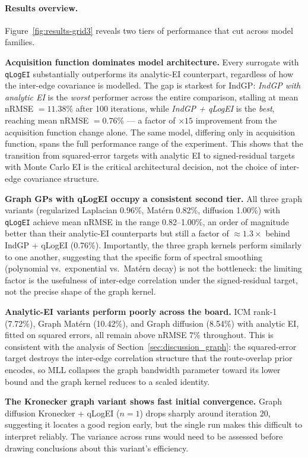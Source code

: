 \documentclass[11pt]{article}
\begin{document}
\paragraph{Results overview.}
Figure~\ref{fig:results-grid3} reveals two tiers of performance that cut
across model families.

\textbf{Acquisition function dominates model architecture.}
Every surrogate with \texttt{qLogEI} substantially outperforms its
analytic-EI counterpart, regardless of how the inter-edge covariance is
modelled.  The gap is starkest for IndGP: \emph{IndGP with analytic EI}
is the \emph{worst} performer across the entire comparison,
stalling at mean nRMSE $= 11.38\%$ after 100 iterations, while
\emph{IndGP + qLogEI} is the \emph{best}, reaching
mean nRMSE $= 0.76\%$ — a factor of $\times 15$ improvement from
the acquisition function change alone.  The same model,
differing only in acquisition function, spans the full performance range
of the experiment.  This shows that the transition from squared-error
targets with analytic EI to signed-residual targets with Monte Carlo EI
is the critical architectural decision, not the choice of inter-edge
covariance structure.

\textbf{Graph GPs with qLogEI occupy a consistent second tier.}
All three graph variants (regularized Laplacian 0.96\%, Matérn 0.82\%,
diffusion 1.00\%) with \texttt{qLogEI} achieve mean nRMSE in the range
0.82--1.00\%, an order of magnitude better than their analytic-EI
counterparts but still a factor of $\approx 1.3\times$ behind
IndGP + qLogEI (0.76\%).  Importantly, the three graph
kernels perform similarly to one another, suggesting that the specific
form of spectral smoothing (polynomial vs.\ exponential vs.\ Matérn
decay) is not the bottleneck: the limiting factor is the usefulness of
inter-edge correlation under the signed-residual target, not the precise
shape of the graph kernel.

\textbf{Analytic-EI variants perform poorly across the board.}
ICM rank-1 (7.72\%), Graph Matérn (10.42\%), and Graph diffusion (8.54\%)
with analytic EI, fitted on squared errors, all remain above nRMSE
$7\%$ throughout.  This is consistent
with the analysis of Section~\ref{sec:discussion_graph}: the
squared-error target destroys the inter-edge correlation structure that
the route-overlap prior encodes, so MLL collapses the graph bandwidth
parameter toward its lower bound and the graph kernel reduces to a
scaled identity.

\textbf{The Kronecker graph variant shows fast initial convergence.}
Graph diffusion Kronecker + qLogEI ($n=1$) drops sharply around
iteration 20, suggesting it locates a good region early, but the single
run makes this difficult to interpret reliably.  The variance across runs
would need to be assessed before drawing conclusions about this variant's
efficiency.
\end{document}
